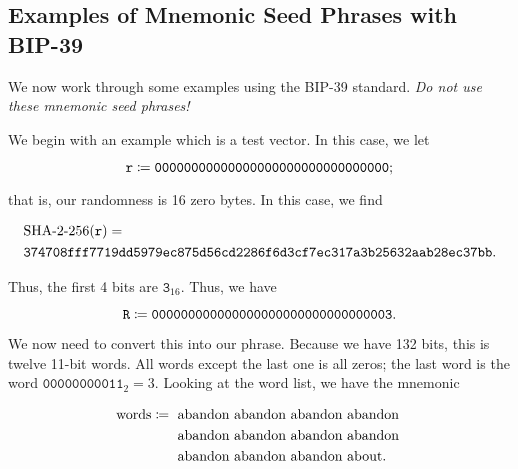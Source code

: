 \subsection{Examples of Mnemonic Seed Phrases with BIP-39}

We now work through some examples using the BIP-39 standard.
\emph{Do not use these mnemonic seed phrases!}

\begin{example}

We begin with an example which is a test vector.
In this case, we let

\begin{equation}
    \texttt{r} \coloneqq{} \texttt{00000000000000000000000000000000};
\end{equation}

\noindent
that is, our randomness is 16 zero bytes.
In this case, we find

\begin{align}
    &\text{\ShaTwo{}-256}(\texttt{r}) = \nonumber\\
    &\texttt{374708fff7719dd5979ec875d56cd2286f6d3cf7ec317a3b25632aab28ec37bb}.
\end{align}

\noindent
Thus, the first 4 bits are $\texttt{3}_{16}$.
Thus, we have

\begin{equation}
    \texttt{R} \coloneqq{} \texttt{000000000000000000000000000000003}.
\end{equation}

We now need to convert this into our phrase.
Because we have 132 bits, this is twelve 11-bit words.
All words except the last one is all zeros;
the last word is the word $\texttt{00000000011}_{2} = 3$.
Looking at the word list,
we have the mnemonic

\begin{align}
    \text{words} \coloneqq{}
        &\text{ abandon abandon abandon abandon } \nonumber\\
        &\text{ abandon abandon abandon abandon } \nonumber\\
        &\text{ abandon abandon abandon about}.
\end{align}



\end{example}

